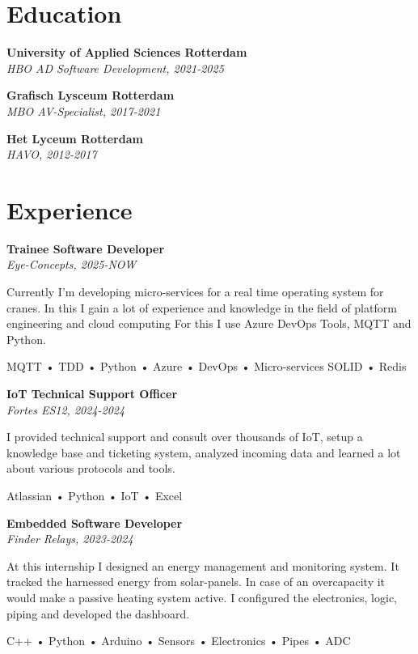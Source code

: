 \documentclass[11pt, twoside, a4paper, titlepage]{article}
\begin{document}
\begin{tcolorbox}[boxsep=0mm, left=0mm, right=0mm, top=0mm, bottom=0mm, height=23cm]
\begin{minipage}[t]{14cm}
\begin{tcolorbox}[grow to left by=0.0cm, colframe=white, colback=white, height=22.9cm]
			\section*{Education}
			\textbf{University of Applied Sciences Rotterdam}\\
			\emph{HBO AD Software Development, 2021-2025}
			
			\vspace*{0.3cm}
			
			\textbf{Grafisch Lysceum Rotterdam}\\
			\emph{MBO AV-Specialist, 2017-2021}
			
			\vspace*{0.3cm}
			
			\textbf{Het Lyceum Rotterdam}\\
			\emph{HAVO, 2012-2017}
			
			\section*{Experience}
			\textbf{Trainee Software Developer}\\
			\emph{Eye-Concepts, 2025-NOW}\\
			\parbox{13cm}{Currently I'm developing micro-services for a real time operating system for cranes. In this I gain a lot of experience and knowledge in the field of platform engineering and cloud computing For this I use Azure DevOps Tools, MQTT and Python.}
			\parbox{13cm}{ MQTT • TDD • Python • Azure • DevOps • Micro-services SOLID • Redis }
			
			\vspace*{0.3cm}
			
			\textbf{IoT Technical Support Officer}\\
			\emph{Fortes ES12, 2024-2024}\\
			\parbox{13cm}{I provided technical support and consult over thousands of IoT, setup a knowledge base and ticketing system, analyzed incoming data and learned a lot about various protocols and tools.}
			\parbox{13cm}{ Atlassian • Python • IoT • Excel }
			
			\vspace*{0.3cm}
			
			\textbf{Embedded Software Developer}\\
			\emph{Finder Relays, 2023-2024}\\
			\parbox{13cm}{At this internship I designed an energy management and monitoring system. It tracked the harnessed energy from solar-panels. In case of an overcapacity it would make a passive heating system active. I configured the electronics, logic, piping and developed the dashboard.}
			\parbox{13cm}{ C++ • Python • Arduino • Sensors • Electronics • Pipes • ADC }
			

\end{tcolorbox}
\end{minipage}
\end{tcolorbox}
\end{document}
